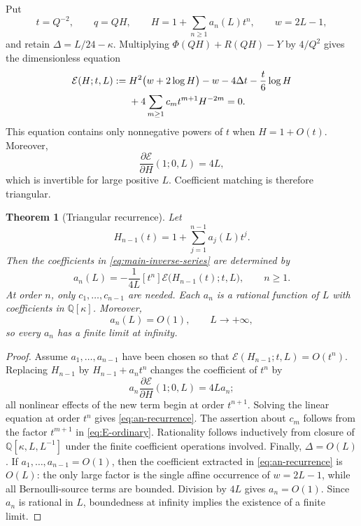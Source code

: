 \documentclass[11pt,oneside]{article}
\theoremstyle{plain}
\newtheorem{theorem}{Theorem}[section]
\theoremstyle{definition}
\theoremstyle{remark}
\newcommand{\Q}{\mathbb{Q}}
\newcommand{\coeff}[2]{\left[#1^{#2}\right]}
\newcommand{\calE}{\mathcal{E}}
\begin{document}
Put
\begin{equation}
 t=Q^{-2},\qquad q=QH,
 \qquad H=1+\sum_{n\ge1}a_n(L)t^n,
 \qquad w=2L-1,
 \label{eq:H-t-def}
\end{equation}
and retain \(\Delta=L/24-\kappa\).  Multiplying
\(\Phi(QH)+R(QH)-Y\) by \(4/Q^2\) gives the dimensionless equation
\begin{align}
 \calE(H;t,L):={}&H^2\bigl(w+2\log H\bigr)-w
 -4\Delta t-\frac{t}{6}\log H
 \notag\\
 &+4\sum_{m\ge1}c_m t^{m+1}H^{-2m}=0.
 \label{eq:E-ordinary}
\end{align}
This equation contains only nonnegative powers of \(t\) when \(H=1+O(t)\).
Moreover,
\begin{equation}
 \frac{\partial\calE}{\partial H}(1;0,L)=4L,
 \label{eq:E-linearization}
\end{equation}
which is invertible for large positive \(L\).  Coefficient matching is
therefore triangular.

\begin{theorem}[Triangular recurrence]
\label{thm:triangular-recurrence}
Let
\begin{equation}
 H_{n-1}(t)=1+\sum_{j=1}^{n-1}a_j(L)t^j.
 \label{eq:H-partial}
\end{equation}
Then the coefficients in \eqref{eq:main-inverse-series} are determined by
\begin{equation}
 \boxed{
 a_n(L)=-\frac1{4L}\coeff{t}{n}
 \calE\bigl(H_{n-1}(t);t,L\bigr),\qquad n\ge1.}
 \label{eq:an-recurrence}
\end{equation}
At order \(n\), only \(c_1,\ldots,c_{n-1}\) are needed.
Each \(a_n\) is a rational function of \(L\) with coefficients in
\(\Q[\kappa]\).  Moreover,
\[
 a_n(L)=O(1),\qquad L\to+\infty,
\]
so every \(a_n\) has a finite limit at infinity.
\end{theorem}

\begin{proof}
Assume \(a_1,\ldots,a_{n-1}\) have been chosen so that
\(\calE(H_{n-1};t,L)=O(t^n)\).  Replacing \(H_{n-1}\) by
\(H_{n-1}+a_nt^n\) changes the coefficient of \(t^n\) by
\[
 a_n\frac{\partial\calE}{\partial H}(1;0,L)=4La_n;
\]
all nonlinear effects of the new term begin at order \(t^{n+1}\).  Solving the
linear equation at order \(t^n\) gives \eqref{eq:an-recurrence}.  The assertion
about \(c_m\) follows from the factor \(t^{m+1}\) in
\eqref{eq:E-ordinary}.  Rationality follows inductively from closure of
\(\Q[\kappa,L,L^{-1}]\) under the finite coefficient operations involved.
Finally, \(\Delta=O(L)\).  If \(a_1,\ldots,a_{n-1}=O(1)\), then the
coefficient extracted in \eqref{eq:an-recurrence} is \(O(L)\): the only
large factor is the single affine occurrence of \(w=2L-1\), while all
Bernoulli-source terms are bounded.  Division by \(4L\) gives
\(a_n=O(1)\).  Since \(a_n\) is rational in \(L\), boundedness at
infinity implies the existence of a finite limit.
\end{proof}
\end{document}
